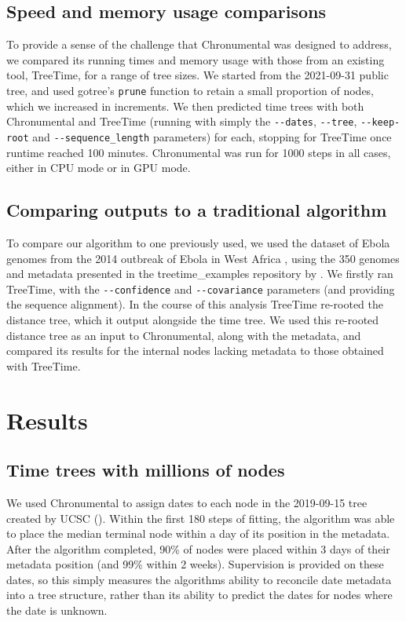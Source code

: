 \subsection*{Speed and memory usage comparisons}
To provide a sense of the challenge that Chronumental was designed to address, we compared its running times and memory usage with those from an existing tool, TreeTime, for a range of tree sizes. We started from the 2021-09-31 public tree, and used gotree's \texttt{prune} function \citep{gotree} to retain a small proportion of nodes, which we increased in increments. We then predicted time trees with both Chronumental and TreeTime (running with simply the \texttt{-{}-dates}, \texttt{-{}-tree}, \texttt{-{}-keep-root} and \texttt{-{}-sequence\_length} parameters) for each, stopping for TreeTime once runtime reached 100 minutes. Chronumental was run for 1000 steps in all cases, either in CPU mode or in GPU mode.


\subsection*{Comparing outputs to a traditional algorithm}

To compare our algorithm to one previously used, we used the dataset of Ebola genomes from the 2014 outbreak of Ebola in West Africa  \citep{Dudas2017-km}, using the 350 genomes and metadata presented in the treetime\_examples repository by \citet{Sagulenko2018-kr}. We firstly ran TreeTime, with the \texttt{-{}-confidence} and \texttt{-{}-covariance} parameters (and providing the sequence alignment). In the course of this analysis TreeTime re-rooted the distance tree, which it output alongside the time tree. We used this re-rooted distance tree as an input to Chronumental, along with the metadata, and compared its results for the internal nodes lacking metadata to those obtained with TreeTime.


\section*{Results}



\subsection*{Time trees with millions of nodes}

We used Chronumental to assign dates to each node in the 2019-09-15 tree created by UCSC (). Within the first 180 steps of fitting, the algorithm was able to place the median terminal node within a day of its position in the metadata. After the algorithm completed, 90\% of nodes were placed within 3 days of their metadata position (and 99\% within 2 weeks). Supervision is provided on these dates, so this simply measures the algorithms ability to reconcile date metadata into a tree structure, rather than its ability to predict the dates for nodes where the date is unknown.

